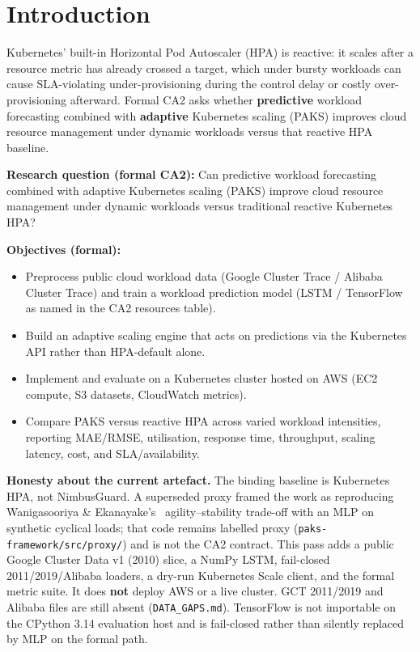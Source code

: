 
\section{Introduction}
\label{sec:Introduction}

Kubernetes' built-in Horizontal Pod Autoscaler (HPA) is reactive: it scales after a resource metric has already crossed a target, which under bursty workloads can cause SLA-violating under-provisioning during the control delay or costly over-provisioning afterward. Formal CA2 asks whether \textbf{predictive} workload forecasting combined with \textbf{adaptive} Kubernetes scaling (PAKS) improves cloud resource management under dynamic workloads versus that reactive HPA baseline.

\textbf{Research question (formal CA2):} Can predictive workload forecasting combined with adaptive Kubernetes scaling (PAKS) improve cloud resource management under dynamic workloads versus traditional reactive Kubernetes HPA?

\textbf{Objectives (formal):}
\begin{itemize}
  \item Preprocess public cloud workload data (Google Cluster Trace / Alibaba Cluster Trace) and train a workload prediction model (LSTM / TensorFlow as named in the CA2 resources table).
  \item Build an adaptive scaling engine that acts on predictions via the Kubernetes API rather than HPA-default alone.
  \item Implement and evaluate on a Kubernetes cluster hosted on AWS (EC2 compute, S3 datasets, CloudWatch metrics).
  \item Compare PAKS versus reactive HPA across varied workload intensities, reporting MAE/RMSE, utilisation, response time, throughput, scaling latency, cost, and SLA/availability.
\end{itemize}

\textbf{Honesty about the current artefact.} The binding baseline is Kubernetes HPA, not NimbusGuard. A superseded proxy framed the work as reproducing Wanigasooriya \& Ekanayake's~\cite{Wanigasooriya26} agility--stability trade-off with an MLP on synthetic cyclical loads; that code remains labelled proxy (\texttt{paks-framework/src/proxy/}) and is not the CA2 contract. This pass adds a public Google Cluster Data v1 (2010) slice, a NumPy LSTM, fail-closed 2011/2019/Alibaba loaders, a dry-run Kubernetes Scale client, and the formal metric suite. It does \textbf{not} deploy AWS or a live cluster. GCT 2011/2019 and Alibaba files are still absent (\texttt{DATA\_GAPS.md}). TensorFlow is not importable on the CPython 3.14 evaluation host and is fail-closed rather than silently replaced by MLP on the formal path.


